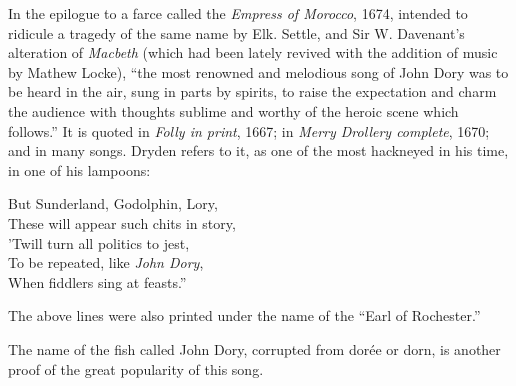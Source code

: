 In the epilogue to a farce called the \textit{Empress of Morocco}, 1674, intended to
ridicule a tragedy of the same name by Elk. Settle, and Sir W. Davenant’s
alteration of \textit{Macbeth} (which had been lately revived with the addition of music
by Mathew Locke), “the most renowned and melodious song of John Dory was
to be heard in the air, sung in parts by spirits, to raise the expectation and charm 
the audience with thoughts sublime and worthy of the heroic scene which follows.” %
It is quoted in \textit{Folly in print}, 1667; \pagebreak 
in \textit{Merry Drollery complete}, 1670; and in
many songs. Dryden refers to it, as one of the most hackneyed in his time,
in one of his lampoons:
\settowidth{\versewidth}{“But Sunderland, Godolphin, Lory,}
\begin{scverse}%
But Sunderland, Godolphin, Lory,\\
These will appear such chits in story,\\
’Twill turn all politics to jest,\\
To be repeated, like \textit{John Dory},\\
When fiddlers sing at feasts.”
\end{scverse}
The above lines were also printed under the name of the “Earl of Rochester.”

The name of the fish called John Dory, corrupted from dorée or dorn, is
another proof of the great popularity of this song.





\settowidth{\versewidth}{And when John Dory to Paris was come}

